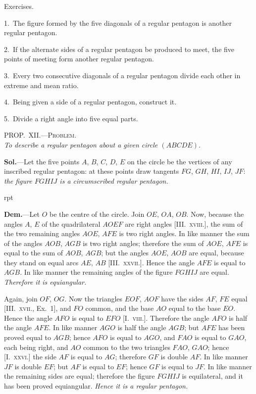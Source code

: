 \documentclass[oneside]{book}
\newcommand\myprop[2]{
\bigskip\Needspace*{4\baselineskip}\begin{center}\textsc{#1}\\\medskip\emph{#2}\par\end{center}
}
\newcommand\exhead[1]{
\Needspace*{5\baselineskip}\begin{center}
\textsf{#1}
\end{center}
}
\newcommand\imgflow[3]{
\setcounter{wrapwidth}{#1}
\begin{wrapfigure}[#2]{r}{\value{wrapwidth}pt}
\begin{center}
\vspace{-0.3in}
\end{center}
\end{wrapfigure}
}
\begin{document}
\exhead{Exercises.}

\begin{footnotesize}
1.~The figure formed by the five diagonals of a regular pentagon
is another regular pentagon.

2.~If the alternate sides of a regular pentagon be produced to
meet, the five points of meeting form another regular pentagon.

3.~Every two consecutive diagonals of a regular pentagon
divide each other in extreme and mean ratio.

4.~Being given a side of a regular pentagon, construct it.

5.~Divide a right angle into five equal parts.
\par\end{footnotesize}

\myprop{PROP\@.~XII\@.---Problem.}{To describe a regular pentagon about a given circle $(ABCDE)$.}

\textbf{Sol.}---Let the five points $A$, $B$, $C$, $D$, $E$ on the circle
be the vertices of any inscribed regular pentagon: at
these points draw tangents $FG$, $GH$, $HI$, $IJ$, $JF$: \emph{the
figure $FGHIJ$ is a circumscribed regular pentagon.}

\imgflow{140}{12}{f164}

\textbf{Dem.}---Let $O$ be the centre of the circle. Join $OE$,
$OA$, $OB$. Now, because the
angles $A$, $E$ of the quadrilateral
$AOEF$ are right angles
[III\@.~\textsc{xviii.}], the sum of the
two remaining angles $AOE$,
$AFE$ is two right angles. In
like manner the sum of the
angles $AOB$, $AGB$ is two
right angles; therefore the
sum of $AOE$, $AFE$ is equal
to the sum of $AOB$, $AGB$;
but the angles $AOE$, $AOB$ are equal, because they
stand on equal arcs $AE$, $AB$ [III\@.~\textsc{xxvii.}]. Hence the
angle $AFE$ is equal to $AGB$. In like manner the
remaining angles of the figure $FGHIJ$ are equal.
\emph{Therefore it is equiangular.}

Again, join $OF$, $OG$. Now the triangles $EOF$, $AOF$
have the sides $AF$, $FE$ equal [III\@.~\textsc{xvii.}, Ex.~1], and $FO$
common, and the base $AO$ equal to the base $EO$. Hence
the angle $AFO$ is equal to $EFO$ [I.~\textsc{viii.}]. Therefore
the angle $AFO$ is half the angle $AFE$. In like manner
$AGO$ is half the angle $AGB$; but $AFE$ has been
proved equal to $AGB$; hence $AFO$ is equal to $AGO$,
and $FAO$ is equal to $GAO$, each being right, and $AO$
common to the two triangles $FAO$, $GAO$; hence
[I.~\textsc{xxvi.}] the side $AF$ is equal to $AG$; therefore $GF$ is
double $AF$. In like manner $JF$ is double $EF$; but $AF$
is equal to $EF$; hence $GF$ is equal to $JF$. In like
manner the remaining sides are equal; therefore the
figure $FGHIJ$ is equilateral, and it has been proved
equiangular. \emph{Hence it is a regular pentagon.}\par\smallskip
\end{document}
